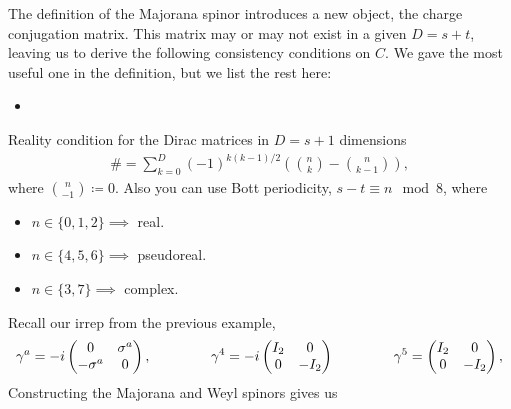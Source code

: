 \documentclass[11pt]{article}
\begin{document}
The definition of the Majorana spinor introduces a new object,
the charge conjugation matrix. This matrix may or may not exist
in a given $D = s + t$, leaving us to derive the following consistency
conditions on $C$. We gave the most useful one in the definition,
but we list the rest here:
\begin{itemize}
    \item {}
\end{itemize}


Reality condition for the Dirac matrices in $D = s + 1$
dimensions
\begin{align*}
    \# = \sum_{k = 0}^D (-1)^{k(k - 1)/2} \left( {n \choose k} - {n \choose k - 1} \right),
\end{align*}
where ${n \choose - 1} \coloneqq 0$. Also you can use
Bott periodicity, $s - t \equiv n \mod 8$, where
\begin{itemize}
    \item $n \in \{ 0, 1, 2 \} \implies $ real.
    \item $n \in \{ 4, 5, 6 \} \implies $ pseudoreal.
    \item $n \in \{ 3, 7 \} \implies $ complex.
\end{itemize}

\begin{eexample}
    [Majorana and Weyl spinors in $D = 3 + 1$]
    Recall our irrep from the previous example,
    \begin{align*}
        \gamma^a = - i \begin{pmatrix}
            0 & \sigma^a\\
            - \sigma^a & 0
        \end{pmatrix},
        \hspace{1.5cm}
        \gamma^4 = -i \begin{pmatrix}
            I_2 & 0\\
            0 & -I_2
        \end{pmatrix}
        \hspace{1.5cm}
        \gamma^5 = \begin{pmatrix}
            I_2 & 0\\
            0 & -I_2
        \end{pmatrix},
    \end{align*}
    Constructing the Majorana and Weyl spinors gives us 
\end{eexample}
\end{document}
